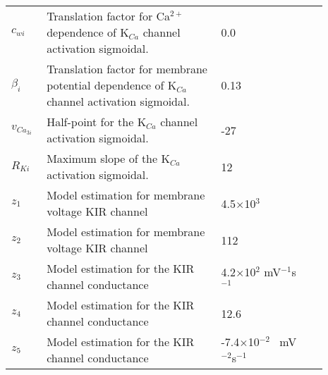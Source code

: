 \documentclass[fleqn]{report}
\numberwithin{equation}{section}
\numberwithin{equation}{section}
\begin{document}
	\begin{table}[h!]
	\centering
	\begin{tabular}{ p{0.09\linewidth}  >{\footnotesize} p{0.5\linewidth}  >{\footnotesize} p{0.27\linewidth} >{\footnotesize} p{0.03\linewidth} }
	\hline
	$c_{wi}$      			& Translation factor for Ca$^{2+}$ dependence of K$_{Ca}$ channel activation sigmoidal.	& 0.0  \uM	&\cite{Koenigsberger2006} \\
	$\beta_{i}$     		& Translation factor for membrane potential dependence of K$_{Ca}$ channel activation sigmoidal.	& 0.13 \uMtwee& \cite{Koenigsberger2006} \\
	$v_{Ca_{3i}}$   		& Half-point for the K$_{Ca}$ channel activation sigmoidal.			& -27 \mV	&\cite{Koenigsberger2006} \\
	$R_{Ki}$      			& Maximum slope of the K$_{Ca}$ activation sigmoidal.				& 12 \mV	&\cite{Koenigsberger2006} \\
	  $ z_1 $	& Model estimation for membrane voltage KIR channel			  & 4.5$\times$10$^3$ \mVpuM & \citep{Filosa2006}\\
	  $ z_2 $	& Model estimation for membrane voltage KIR channel			  & 112	 \mV & \citep{Filosa2006}\\
	  $ z_3 $	& Model estimation for the KIR channel conductance			  & 4.2$\times$10$^2$ mV$^{-1}$s$^{-1}$ & \citep{Filosa2006}\\
	  $ z_4 $	& Model estimation for the KIR channel conductance			  & 12.6			 \uMpmVs & \citep{Filosa2006}\\
	  $ z_5 $	& Model estimation for the KIR channel conductance			  & -7.4$\times$10$^{-2}$		 \uM~mV$^{-2}$s$^{-1}$  & \citep{Filosa2006}\\
	  \hline
	\end{tabular}
	\label{tab:Addeq}
	\end{table}
\end{document}

